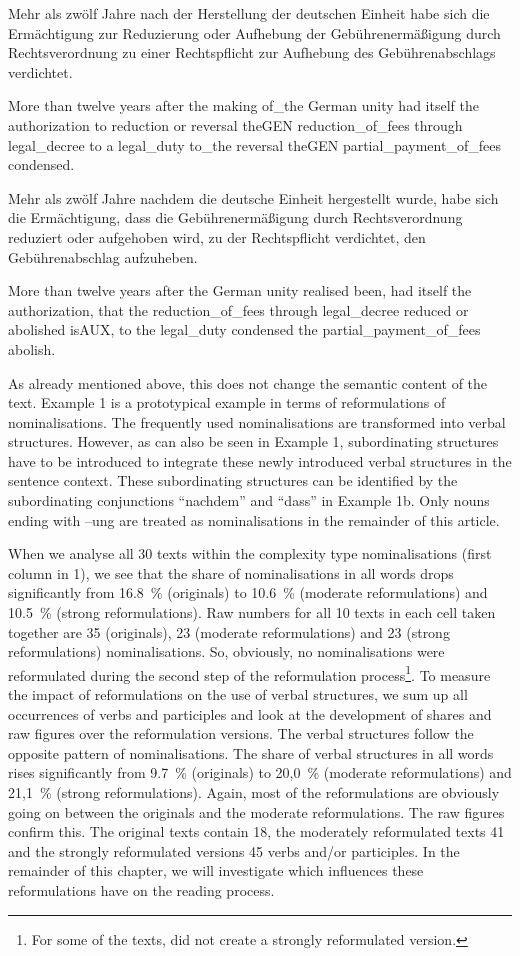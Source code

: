 \documentclass[output=paper]{langsci/langscibook}
\begin{document}
Mehr als zwölf Jahre nach der Herstellung der deutschen Einheit habe sich die Ermächtigung zur Reduzierung oder Aufhebung der Gebührenermäßigung durch Rechtsverordnung zu einer Rechtspflicht zur Aufhebung des Gebührenabschlags verdichtet.

More than twelve years after the making of\_the German unity had itself the authorization to reduction or reversal theGEN reduction\_of\_fees through legal\_decree to a legal\_duty to\_the reversal theGEN partial\_payment\_of\_fees condensed.

Mehr als zwölf Jahre nachdem die deutsche Einheit hergestellt wurde, habe sich die Ermächtigung, dass die Gebührenermäßigung durch Rechtsverordnung reduziert oder aufgehoben wird, zu der Rechtspflicht   verdichtet, den Gebührenabschlag aufzuheben.

More than twelve years after the German unity   realised been, had itself the authorization, that the reduction\_of\_fees through legal\_decree reduced or abolished isAUX, to the legal\_duty condensed the partial\_payment\_of\_fees abolish.

As already mentioned above, this does not change the semantic content of the text. Example 1 is a prototypical example in terms of reformulations of nominalisations. The frequently used nominalisations are transformed into verbal structures. However, as can also be seen in Example 1, subordinating structures have to be introduced to integrate these newly introduced verbal structures in the sentence context. These subordinating structures can be identified by the subordinating conjunctions “nachdem” and “dass” in Example 1b. Only nouns ending with –ung are treated as nominalisations in the remainder of this article.

When we analyse all 30 texts within the complexity type nominalisations (first column in 1), we see that the share of nominalisations in all words drops significantly from 16.8~\% (originals) to 10.6~\% (moderate reformulations) and 10.5~\% (strong reformulations). Raw numbers for all 10 texts in each cell taken together are 35 (originals), 23 (moderate reformulations) and 23 (strong reformulations) nominalisations. So, obviously, no nominalisations were reformulated during the second step of the reformulation process\footnote{For some of the texts, \citet{HansenEtAl2006} did not create a strongly reformulated version.}. To measure the impact of reformulations on the use of verbal structures, we sum up all occurrences of verbs and participles and look at the development of shares and raw figures over the reformulation versions. The verbal structures follow the opposite pattern of nominalisations. The share of verbal structures in all words rises significantly from 9.7~\% (originals) to 20,0~\% (moderate reformulations) and 21,1~\% (strong reformulations). Again, most of the reformulations are obviously going on between the originals and the moderate reformulations. The raw figures confirm this. The original texts contain 18, the moderately reformulated texts 41 and the strongly reformulated versions 45 verbs and/or participles. In the remainder of this chapter, we will investigate which influences these reformulations have on the reading process.
\end{document}
